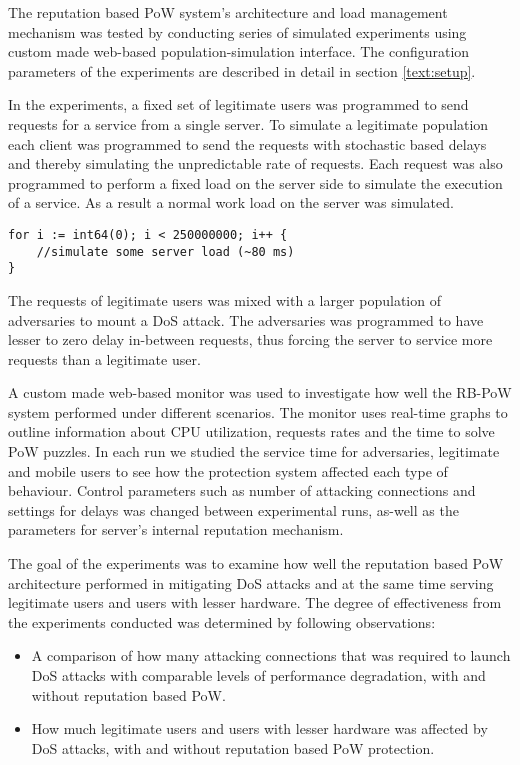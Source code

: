 The reputation based PoW system's architecture and load management mechanism was tested by conducting series of simulated experiments using custom made web-based population-simulation interface. The configuration parameters of the experiments are described in detail in section \ref{text:setup}.

In the experiments, a fixed set of legitimate users was programmed to send requests for a service from a single server. To simulate a legitimate population each client was programmed to send the requests with stochastic based delays and thereby simulating the unpredictable rate of requests. Each request was also programmed to perform a fixed load on the server side to simulate the execution of a service. As a result a normal work load on the server was simulated. 
\begin{verbatim}	
for i := int64(0); i < 250000000; i++ {
	//simulate some server load (~80 ms)
}
\end{verbatim}
The requests of legitimate users was mixed with a larger population of adversaries to mount a DoS attack. The adversaries was programmed to have lesser to zero delay in-between requests, thus forcing the server to service more requests than a legitimate user. 

A custom made web-based monitor was used to investigate how well the RB-PoW system performed under different scenarios. The monitor uses real-time graphs to outline information about CPU utilization, requests rates and the time to solve PoW puzzles. In each run we studied the service time for adversaries, legitimate and mobile users to see how the protection system affected each type of behaviour. Control parameters such as number of attacking connections and settings for delays was changed between experimental runs, as-well as the parameters for server's internal reputation mechanism.

The goal of the experiments was to examine how well the reputation based PoW architecture performed in mitigating DoS attacks and at the same time serving legitimate users and users with lesser hardware. The degree of effectiveness from the experiments conducted was determined by following observations:

\begin{itemize}
\item A comparison of how many attacking connections that was required to launch DoS attacks with comparable levels of performance degradation, with and without reputation based PoW.

\item How much legitimate users and users with lesser hardware was affected by DoS attacks, with and without reputation based PoW protection.
\end{itemize}


